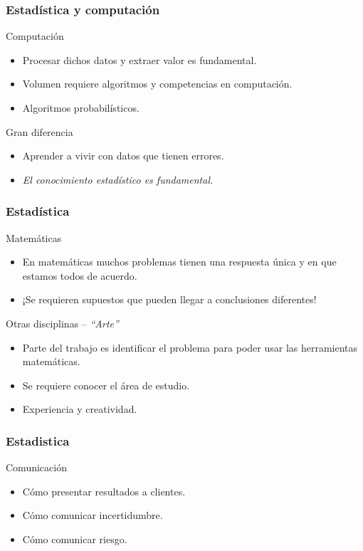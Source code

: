 \documentclass[table]{beamer}
\begin{document}
\begin{frame}
    \frametitle{Estadística y computación}
    \begin{block}{Computación}
        \begin{itemize}
            \item Procesar dichos datos y extraer valor es fundamental.
            \item Volumen requiere algoritmos y competencias en computación.
            \item Algoritmos probabilísticos.
        \end{itemize}
    \end{block}
    \begin{block}{Gran diferencia}
        \begin{itemize}
            \item Aprender a vivir con datos que tienen errores.
            \item \emph{El conocimiento estadístico es fundamental.}
        \end{itemize}
    \end{block}
\end{frame}

\begin{frame}
    \frametitle{Estadística}
    \begin{block}{Matemáticas}
        \begin{itemize}
            \item En matemáticas muchos problemas tienen una respuesta única y en que estamos todos de acuerdo.
            \item ¡Se requieren supuestos que pueden llegar a conclusiones diferentes!
        \end{itemize}
    \end{block}
    \begin{block}{Otras disciplinas -- \emph{``Arte''}}
        \begin{itemize}
            \item Parte del trabajo es identificar el problema para poder usar las herramientas matemáticas.
            \item Se requiere conocer el área de estudio.
            \item Experiencia y creatividad.
        \end{itemize}
    \end{block}
    \end{frame}
    \begin{frame}
    \frametitle{Estadistica}
    \begin{block}{Comunicación}
        \begin{itemize}
            \item Cómo presentar resultados a clientes.
            \item Cómo comunicar incertidumbre.
            \item Cómo comunicar riesgo.
        \end{itemize}
    \end{block}
\end{frame}
\end{document}
